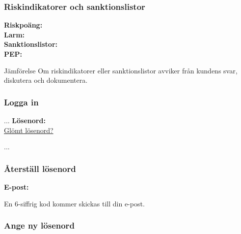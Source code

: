 \documentclass[10pt]{beamer}
\begin{document}
\begin{frame}[label=riskindikator]
  \frametitle{Riskindikatorer och sanktionslistor}
  \small
  \textbf{Riskpoäng:} \underline{\hspace{8cm}} \\
  \textbf{Larm:} \underline{\hspace{8cm}} \\
  \textbf{Sanktionslistor:} \underline{\hspace{8cm}} \\
  \textbf{PEP:} \underline{\hspace{8cm}} \\
  \vspace{0.5cm}
  \begin{block}{Jämförelse}
    Om riskindikatorer eller sanktionslistor avviker från kundens svar, diskutera och dokumentera.
  \end{block}
  \vspace{0.8cm}
  \begin{flushright}
    \hyperlink{nextslide}{}\begin{frame}[label=login]
  \frametitle{Logga in}
  
  ...
  \textbf{Lösenord:} \underline{\hspace{6.5cm}} \\
  
  \vspace{0.3cm}
  \footnotesize
  \hyperlink{forgotpassword}{\textcolor{terracotta}{Glömt lösenord?}}
  
  \vspace{0.8cm}
  ...
\end{frame}

\begin{frame}[label=forgotpassword]
  \frametitle{Återställ lösenord}
  
  \textbf{E-post:} \underline{\hspace{6.5cm}} \\
  
  \vspace{0.8cm}
  
  \vspace{1cm}
  \footnotesize
  En 6-siffrig kod kommer skickas till din e-post.
\end{frame}

\begin{frame}[label=resetpassword]
  \frametitle{Ange ny lösenord}
  

\end{frame}
\end{flushright}
\end{frame}
\end{document}
